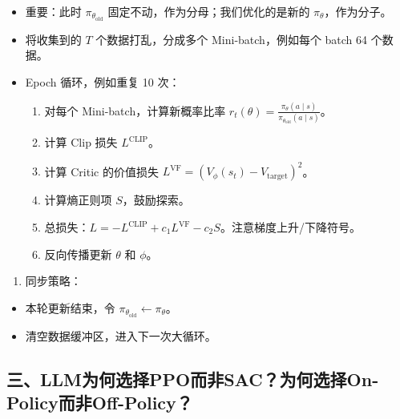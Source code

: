 \begin{itemize}
\tightlist
\item
  重要：此时 \(\pi_{\theta_{\mathrm{old}}}\) 固定不动，作为分母；我们优化的是新的 \(\pi_\theta\)，作为分子。
\item
  将收集到的 \(T\) 个数据打乱，分成多个 Mini-batch，例如每个 batch 64 个数据。
\item
{}
  Epoch 循环，例如重复 10 次：

  \begin{enumerate}
  \def\labelenumi{\arabic{enumi}.}
  \tightlist
  \item
    对每个 Mini-batch，计算新概率比率 \(r_t(\theta)=\frac{\pi_\theta(a \mid s)}{\pi_{\theta_{\mathrm{old}}}(a \mid s)}\)。
  \item
    计算 Clip 损失 \(L^{\mathrm{CLIP}}\)。
  \item
    计算 Critic 的价值损失 \(L^{\mathrm{VF}} = (V_\phi(s_t) - V_{\mathrm{target}})^2\)。
  \item
    计算熵正则项 \(S\)，鼓励探索。
  \item
    总损失：\(L = -L^{\mathrm{CLIP}} + c_1 L^{\mathrm{VF}} - c_2 S\)。注意梯度上升/下降符号。
  \item
    反向传播更新 \(\theta\) 和 \(\phi\)。
  \end{enumerate}
\end{itemize}

\begin{enumerate}
\def\labelenumi{\arabic{enumi}.}
\setcounter{enumi}{3}
\tightlist
\item
{}
  同步策略：
\end{enumerate}

\begin{itemize}
\tightlist
\item
  本轮更新结束，令 \(\pi_{\theta_{\mathrm{old}}} \leftarrow \pi_\theta\)。
\item
  清空数据缓冲区，进入下一次大循环。
\end{itemize}

\hypertarget{ux4e09llmux4e3aux4f55ux9009ux62e9ppoux800cux975esacux4e3aux4f55ux9009ux62e9on-policyux800cux975eoff-policy}{%
\subsection{三、LLM为何选择PPO而非SAC？为何选择On-Policy而非Off-Policy？}\label{ux4e09llmux4e3aux4f55ux9009ux62e9ppoux800cux975esacux4e3aux4f55ux9009ux62e9on-policyux800cux975eoff-policy}}

